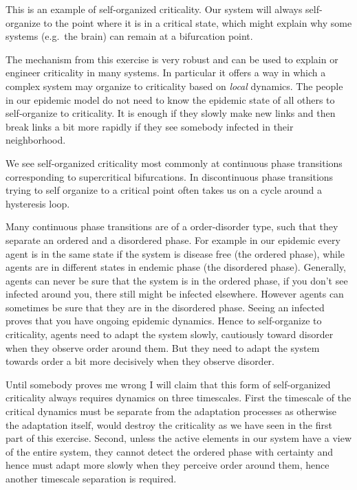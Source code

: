 This is an example of self-organized criticality. Our system will always self-organize to the point where it is in a critical state, which might explain why some systems (e.g.~the brain) can remain at a bifurcation point.

The mechanism from this exercise is very robust and can be used to explain or engineer criticality in many systems. In particular it offers a way in which a complex system may organize to criticality based on \emph{local} dynamics. 
The people in our epidemic model do not need to know the epidemic state of all others to self-organize to criticality. It is enough if they slowly make new links and then break links a bit more rapidly if they see somebody infected in their neighborhood.

We see self-organized criticality most commonly at continuous phase transitions corresponding to supercritical bifurcations. In discontinuous phase transitions trying to self organize to a critical point often takes us on a cycle around a hysteresis loop.

Many continuous phase transitions are of a order-disorder type, such that they separate an ordered and a disordered phase. For example in our epidemic every agent is in the same state if the system is disease free (the ordered phase), while agents are in different states in endemic phase (the disordered phase). 
Generally, agents can never be sure that the system is in the ordered phase, if you don't see infected around you, there still might be infected elsewhere. However agents can sometimes be sure that they are in the disordered phase. Seeing an infected proves that you have ongoing epidemic dynamics. Hence to self-organize to criticality, agents need to adapt the system slowly, cautiously toward disorder when they observe order around them. But they need to adapt the system towards order a bit more decisively when they observe disorder. 

Until somebody proves me wrong I will claim that this form of self-organized criticality always requires dynamics on three timescales. First the timescale of the critical dynamics must be separate from the adaptation processes as otherwise the adaptation itself, would destroy the criticality as we have seen in the first part of this exercise. Second, unless the active elements in our system have a view of the entire system, they cannot detect the ordered phase with certainty and hence must adapt more slowly when they perceive order around them, hence another timescale separation is required. 

